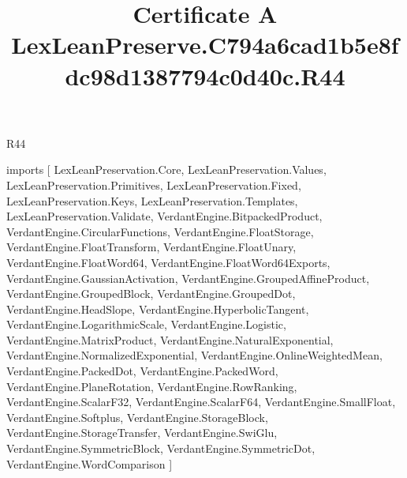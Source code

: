 \begin{lexlean}{R44}
\title{Certificate A LexLeanPreserve.C794a6cad1b5e8fdc98d1387794c0d40c.R44}
\begin{coremodule}
imports [
  LexLeanPreservation.Core,
  LexLeanPreservation.Values,
  LexLeanPreservation.Primitives,
  LexLeanPreservation.Fixed,
  LexLeanPreservation.Keys,
  LexLeanPreservation.Templates,
  LexLeanPreservation.Validate,
  VerdantEngine.BitpackedProduct,
  VerdantEngine.CircularFunctions,
  VerdantEngine.FloatStorage,
  VerdantEngine.FloatTransform,
  VerdantEngine.FloatUnary,
  VerdantEngine.FloatWord64,
  VerdantEngine.FloatWord64Exports,
  VerdantEngine.GaussianActivation,
  VerdantEngine.GroupedAffineProduct,
  VerdantEngine.GroupedBlock,
  VerdantEngine.GroupedDot,
  VerdantEngine.HeadSlope,
  VerdantEngine.HyperbolicTangent,
  VerdantEngine.LogarithmicScale,
  VerdantEngine.Logistic,
  VerdantEngine.MatrixProduct,
  VerdantEngine.NaturalExponential,
  VerdantEngine.NormalizedExponential,
  VerdantEngine.OnlineWeightedMean,
  VerdantEngine.PackedDot,
  VerdantEngine.PackedWord,
  VerdantEngine.PlaneRotation,
  VerdantEngine.RowRanking,
  VerdantEngine.ScalarF32,
  VerdantEngine.ScalarF64,
  VerdantEngine.SmallFloat,
  VerdantEngine.Softplus,
  VerdantEngine.StorageBlock,
  VerdantEngine.StorageTransfer,
  VerdantEngine.SwiGlu,
  VerdantEngine.SymmetricBlock,
  VerdantEngine.SymmetricDot,
  VerdantEngine.WordComparison
]


\end{coremodule}
\end{lexlean}
